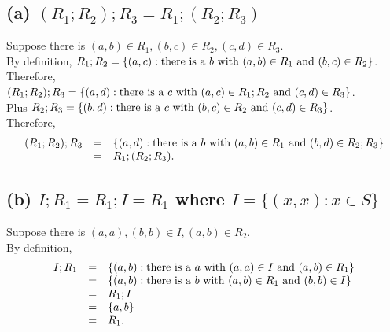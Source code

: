 \documentclass[]{article}
\begin{document}
\begin{spacing}{1.5}
\subsection*{(a) $ (R_1; R_2) ; R_3 = R_1 ; (R_2; R_3)$} 
Suppose there is $ (a, b) \in R_1, (b, c) \in R_2, (c, d) \in R_3 $.\\
By definition, $ R_1; R_2 = \{(a, c) : \text{there is a $ b $ with } (a, b) \in R_1 \text{ and } (b, c) \in R_2\} $.\\
Therefore, $ (R_1; R_2) ; R_3 = \{(a, d) : \text{there is a $ c $ with } (a, c) \in R_1; R_2 \text{ and } (c, d) \in R_3\} $.\\
Plus $ R_2; R_3 = \{(b, d) : \text{there is a $ c $ with } (b, c) \in R_2 \text{ and } (c, d) \in R_3\} $.\\
Therefore, 
\[
\begin{array}{rcl}
	(R_1; R_2) ; R_3 &=& \{(a, d) : \text{there is a $ b $ with } (a, b) \in R_1 \text{ and } (b, d) \in R_2; R_3\} \\
	&=& R_1 ; (R_2; R_3).
\end{array}
\]


\subsection*{(b) $ I; R_1 = R_1; I = R_1 $ where $ I = \{(x,x):x \in S\} $}
Suppose there is $ (a, a), (b, b) \in I, (a, b) \in R_2 $.\\
By definition, 
\[\begin{array}{rcl}
	 I; R_1 &=& \{(a, b) : \text{there is a $ a $ with } (a, a) \in I \text{ and } (a, b) \in R_1\} \\
	&=& \{(a, b) : \text{there is a $ b $ with } (a, b) \in R_1 \text{ and } (b, b) \in I \} \\
	&=& R_1; I\\
	&=& \{a, b\}\\
	&=& R_1.
\end{array}\]


\end{spacing}
\end{document}

